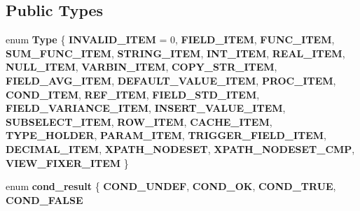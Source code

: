 \subsection*{Public Types}
\begin{DoxyCompactItemize}
\item 
\mbox{\label{classItem_a6b718f9918eb7a5b2d4572cc1a231005}} 
enum {\bfseries Type} \{ \newline
{\bfseries I\+N\+V\+A\+L\+I\+D\+\_\+\+I\+T\+EM} = 0, 
{\bfseries F\+I\+E\+L\+D\+\_\+\+I\+T\+EM}, 
{\bfseries F\+U\+N\+C\+\_\+\+I\+T\+EM}, 
{\bfseries S\+U\+M\+\_\+\+F\+U\+N\+C\+\_\+\+I\+T\+EM}, 
\newline
{\bfseries S\+T\+R\+I\+N\+G\+\_\+\+I\+T\+EM}, 
{\bfseries I\+N\+T\+\_\+\+I\+T\+EM}, 
{\bfseries R\+E\+A\+L\+\_\+\+I\+T\+EM}, 
{\bfseries N\+U\+L\+L\+\_\+\+I\+T\+EM}, 
\newline
{\bfseries V\+A\+R\+B\+I\+N\+\_\+\+I\+T\+EM}, 
{\bfseries C\+O\+P\+Y\+\_\+\+S\+T\+R\+\_\+\+I\+T\+EM}, 
{\bfseries F\+I\+E\+L\+D\+\_\+\+A\+V\+G\+\_\+\+I\+T\+EM}, 
{\bfseries D\+E\+F\+A\+U\+L\+T\+\_\+\+V\+A\+L\+U\+E\+\_\+\+I\+T\+EM}, 
\newline
{\bfseries P\+R\+O\+C\+\_\+\+I\+T\+EM}, 
{\bfseries C\+O\+N\+D\+\_\+\+I\+T\+EM}, 
{\bfseries R\+E\+F\+\_\+\+I\+T\+EM}, 
{\bfseries F\+I\+E\+L\+D\+\_\+\+S\+T\+D\+\_\+\+I\+T\+EM}, 
\newline
{\bfseries F\+I\+E\+L\+D\+\_\+\+V\+A\+R\+I\+A\+N\+C\+E\+\_\+\+I\+T\+EM}, 
{\bfseries I\+N\+S\+E\+R\+T\+\_\+\+V\+A\+L\+U\+E\+\_\+\+I\+T\+EM}, 
{\bfseries S\+U\+B\+S\+E\+L\+E\+C\+T\+\_\+\+I\+T\+EM}, 
{\bfseries R\+O\+W\+\_\+\+I\+T\+EM}, 
\newline
{\bfseries C\+A\+C\+H\+E\+\_\+\+I\+T\+EM}, 
{\bfseries T\+Y\+P\+E\+\_\+\+H\+O\+L\+D\+ER}, 
{\bfseries P\+A\+R\+A\+M\+\_\+\+I\+T\+EM}, 
{\bfseries T\+R\+I\+G\+G\+E\+R\+\_\+\+F\+I\+E\+L\+D\+\_\+\+I\+T\+EM}, 
\newline
{\bfseries D\+E\+C\+I\+M\+A\+L\+\_\+\+I\+T\+EM}, 
{\bfseries X\+P\+A\+T\+H\+\_\+\+N\+O\+D\+E\+S\+ET}, 
{\bfseries X\+P\+A\+T\+H\+\_\+\+N\+O\+D\+E\+S\+E\+T\+\_\+\+C\+MP}, 
{\bfseries V\+I\+E\+W\+\_\+\+F\+I\+X\+E\+R\+\_\+\+I\+T\+EM}
 \}
\item 
\mbox{\label{classItem_ab74b339b7c522a3a7aa2b8e4e8123a1b}} 
enum {\bfseries cond\+\_\+result} \{ {\bfseries C\+O\+N\+D\+\_\+\+U\+N\+D\+EF}, 
{\bfseries C\+O\+N\+D\+\_\+\+OK}, 
{\bfseries C\+O\+N\+D\+\_\+\+T\+R\+UE}, 
{\bfseries C\+O\+N\+D\+\_\+\+F\+A\+L\+SE}

\end{DoxyCompactItemize}
